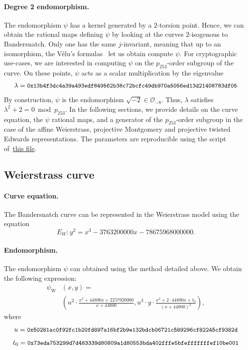 \documentclass[smallextended]{svjour3}
\begin{document}
\paragraph{Degree 2 endomorphism.}
The endomorphism $\psi$ has a kernel generated by a $2$-torsion
point. Hence, we can obtain the rational maps defining $\psi$ by
looking at the curves $2$-isogenous to Bandersnatch. Only one has the
same $j$-invariant, meaning that up to an isomorphism, the Vélu's
formulas~\cite{velu71} let us obtain compute $\psi$.
For cryptographic use-cases, we are interested in computing $\psi$ on
the $p_{253}$-order subgroup of the curve. On these points, $\psi$
acts as a scalar multiplication by the eigenvalue
$$\lambda = \text{{\small{\tt
0x13b4f3dc4a39a493edf849562b38c72bcfc49db970a5056ed13d21408783df05}}}$$
By construction, $\psi$ is the endomorphism $\sqrt{-2}\in \mathcal
O_{-8}$. Thus, $\lambda$ satisfies
$\lambda^2+2 = 0 \bmod p_{253}$.
In the following sections, we provide details on the curve equation,
the $\psi$ rational maps, and a generator of the $p_{253}$-order
subgroup in the case of the affine Weierstrass, projective Montgomery
and projective twisted Edwards representations.
The parameters are reproducible using the script
of~\href{https://github.com/asanso/Bandersnatch/blob/main/python-ref-impl/get\_params.py}{this
  file}.

\subsection{Weierstrass curve}\label{sec-w-curve}
\paragraph{Curve equation.}
The Bandersnatch curve can be represented in the Weierstrass model
using the equation
$$E_W:y^2 = x^3 -3763200000x -78675968000000.$$

\paragraph{Endomorphism.}
The endomorphism $\psi$ can obtained using the method detailed above.
We obtain the following expression:
\begin{align*}
  \psi_\text{W}&(x,y) = \\
  &\left(u^2\cdot \frac{x^2+44800x+2257920000}{x+44800}, u^3\cdot
y\cdot \frac{x^2+2\cdot 44800x+t_0}{(x+44800)^2}\right),
\end{align*}
where
$$u = \text{{\small{\tt 0x50281ac0f92fc1b20fd897a16bf2b9e132bdcb06721c589296cf82245cf9382d}}}$$
$$t_0 = \text{{\small{\tt 0x73eda753299d7d483339d80809a1d80553bda402fffe5bfefffffffef10be001}}}$$
\end{document}
